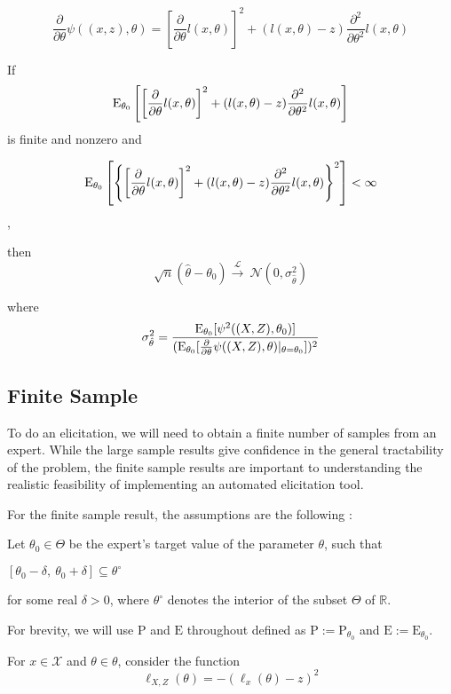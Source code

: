 $$\frac{\partial}{\partial \theta} \psi((x,z),\theta) = \left[ \frac{\partial}{\partial \theta}l(x,\theta) \right]^2  + (l(x,\theta)-z) \frac{\partial^2}{\partial \theta^2}l(x,\theta)$$

If $$\mathrm{E}_{\theta_0} \left[ \left[ \frac{\partial}{\partial \theta}l(x,\theta) \right]^2  + (l(x,\theta)-z) \frac{\partial^2}{\partial \theta^2}l(x,\theta) \right] $$ is finite and nonzero and 

$$
\mathrm{E}_{\theta_0} \left[ \left\lbrace \left[ \frac{\partial}{\partial \theta}l(x,\theta) \right]^2  + (l(x,\theta)-z) \frac{\partial^2}{\partial \theta^2}l(x,\theta)\right\rbrace^2 \right] < \infty
$$,

then $$\sqrt{n}(\hat{\theta}-\theta_0) \xrightarrow{\mathcal{L}}\ \mathcal{N}(0,\sigma_{\hat{\theta}}^2)$$

where $$\sigma_{\hat{\theta}}^2 = \frac{\mathrm{E}_{\theta_0}[\psi^2((X,Z),\theta_0)]}{(\mathrm{E}_{\theta_0} [\frac{\partial}{\partial \theta} \psi((X,Z),\theta)|_{\theta=\theta_0}])^2}$$


\subsection{Finite Sample}

To do an elicitation, we will need to obtain a finite number of samples from an expert. While the large sample results give confidence in the general tractability of the problem, the finite sample results are important to understanding the realistic feasibility of implementing an automated elicitation tool.  

For the finite sample result, the assumptions are the following \cite{Pinelis2017}:

Let $\theta_{0}\in \Theta$ be the expert's target value of the parameter $\theta$, such that
\begin{center}
	$[\theta_{0}-\delta,\ \theta_{0}+\delta]\subseteq \theta^{\circ}$ 
\end{center}
for some real $\delta>0$, where $\theta^{\circ}$ denotes the interior of the subset $\Theta$ of $\mathbb{R}$. 

For brevity, we will use $\mathrm{P}$ and $\mathrm{E}$ throughout defined as $\mathrm{P} :=\mathrm{P}_{\theta_{0}}$ and $\mathrm{E} :=\mathrm{E}_{\theta_{0}}.$

For $x\in \mathcal{X}$ and $\theta\in \theta$, consider the function
$$
\ell_{X,Z}(\theta)=- (\ell_x(\theta)-z)^2
$$

